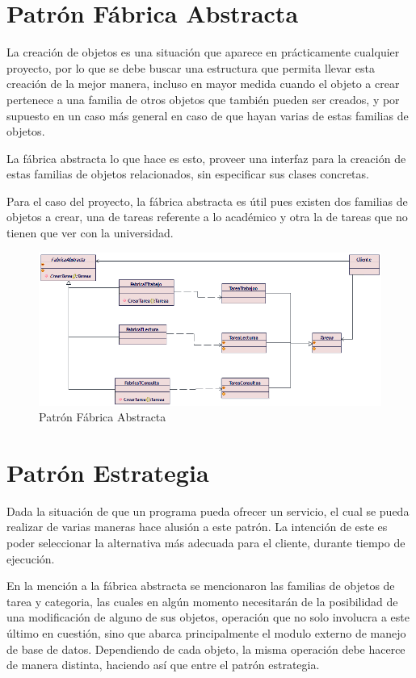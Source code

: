 \section{Patrón Fábrica Abstracta}
La creación de objetos es una situación que aparece en prácticamente cualquier proyecto, por lo que se debe buscar una estructura que permita llevar esta creación de la mejor manera, incluso en mayor medida cuando el objeto a crear pertenece a una familia de otros objetos que también pueden ser creados, y por supuesto en un caso más general en caso de que hayan varias de estas familias de objetos.

La fábrica abstracta lo que hace es esto, proveer una interfaz para la creación de estas familias de objetos relacionados, sin especificar sus clases concretas.

Para el caso del proyecto, la fábrica abstracta es útil pues existen dos familias de objetos a crear, una de tareas referente a lo académico y otra la de tareas que no tienen que ver con la universidad.

\begin{figure}[H]
	\centering
	\includegraphics[width=1\linewidth]{diseno/patrones/imgs/FabricaAbstracta}
	\caption{Patrón Fábrica Abstracta}
	\label{fig:gantt}
\end{figure}

\section{Patrón Estrategia}
Dada la situación de que un programa pueda ofrecer un servicio, el cual se pueda realizar de varias maneras hace alusión a este patrón. La intención de este es poder seleccionar la alternativa más adecuada para el cliente, durante tiempo de ejecución.

En la mención a la fábrica abstracta se mencionaron las familias de objetos de tarea y categoria, las cuales en algún momento necesitarán de la posibilidad de una modificación de alguno de sus objetos, operación que no solo involucra a este último en cuestión, sino que abarca principalmente el modulo externo de manejo de base de datos. Dependiendo de cada objeto, la misma operación debe hacerce de manera distinta, haciendo así que entre el patrón estrategia.

